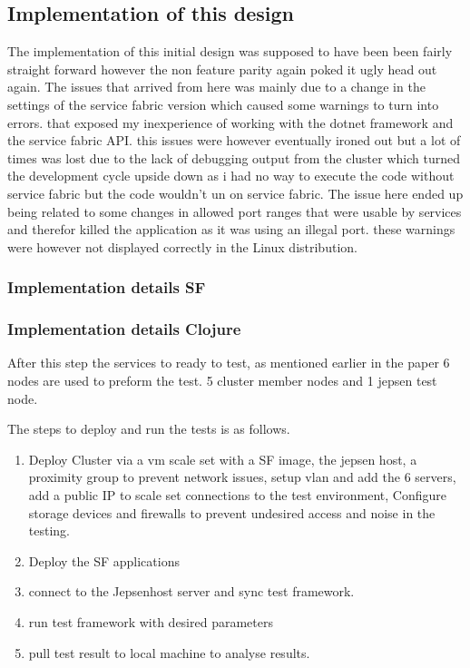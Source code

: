 \documentclass[a4paper,10pt,titlepage]{report}
\begin{document}
    \subsection{Implementation of this design}


    The implementation of this initial design was supposed to have been been fairly straight forward however the non feature parity again poked it ugly head out again. The issues that arrived from here was mainly due to a change in the settings of the service fabric version which caused some warnings to turn into errors. that exposed my inexperience of working with the dotnet framework and the service fabric API. this issues were however eventually ironed out but a lot of times was lost due to the lack of debugging output from the cluster which turned the development cycle upside down as i had no way to execute the code without service fabric but the code wouldn't un on service fabric. The issue here ended up being related to some changes in allowed port ranges that were usable by services and therefor killed the application as it was using an illegal port. these warnings were however not displayed correctly in the Linux distribution.

    \subsubsection{Implementation details SF}

    \subsubsection{Implementation details Clojure}



    After this step the services to ready to test, as mentioned earlier in the paper 6 nodes are used to preform the test. 5 cluster member nodes and 1 jepsen test node.

    The steps to deploy and run the tests is as follows.

\begin{enumerate}
    \item Deploy Cluster via a vm scale set with a SF image, the jepsen host, a proximity group to prevent network issues, setup vlan and add the 6 servers, add a public IP to scale set connections to the test environment, Configure storage devices and firewalls to prevent undesired access and noise in the testing.
    \item Deploy the SF applications
    \item connect to the Jepsenhost server and sync test framework.
    \item run test framework with desired parameters
    \item pull test result to local machine to analyse results.
\end{enumerate}
\end{document}
